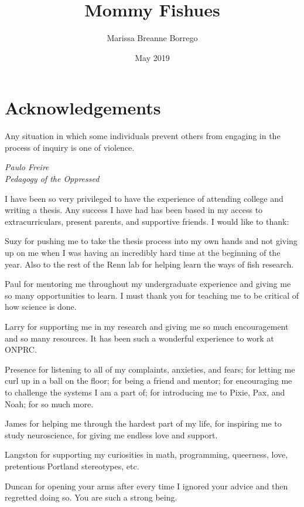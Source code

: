 \documentclass[12pt,twoside]{reedthesis}
\title{Mommy Fishues}
\author{Marissa Breanne Borrego}
\date{May 2019}
\begin{document}
  \maketitle
  \frontmatter %
  \pagestyle{empty} %

    \chapter*{Acknowledgements}
	\epigraph{Any situation in which some individuals prevent others from engaging in the process of inquiry is one of violence.}{\textit{Paulo Freire \\ Pedagogy of the Oppressed}}
	
	I have been so very privileged to have the experience of attending college and writing a thesis. Any success I have had has been based in my access to extracurriculars, present parents, and supportive friends. I would like to thank:
	
	Suzy for pushing me to take the thesis process into my own hands and not
  giving up on me when I was having an incredibly hard time at the beginning of
  the year. Also to the rest of the Renn lab for helping learn the ways of fish research.
	
	Paul for mentoring me throughout my undergraduate experience and giving me so many opportunities to learn. I must thank you for teaching me to be critical of how science is done.
	
	Larry for supporting me in my research and giving me so much encouragement and so many resources. It has been such a wonderful experience to work at ONPRC.
	
	Presence for listening to all of my complaints, anxieties, and fears; for letting me curl up in a ball on the floor; for being a friend and mentor; for encouraging me to challenge the systems I am a part of; for introducing me to Pixie, Pax, and Noah; for so much more.
	
	James for helping me through the hardest part of my life, for inspiring me to study neuroscience, for giving me endless love and support.
	
	Langston for supporting my curiosities in math, programming, queerness, love, pretentious Portland stereotypes, etc.
	
	Duncan for opening your arms after every time I ignored your advice and then regretted doing so. You are such a strong being.
	
\end{document}
